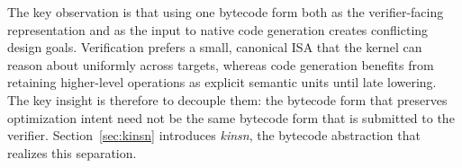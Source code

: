 %

The key observation is that using one bytecode form both as the verifier-facing representation and as the input to native code generation creates conflicting design goals. Verification prefers a small, canonical ISA that the kernel can reason about uniformly across targets, whereas code generation benefits from retaining higher-level operations as explicit semantic units until late lowering. The key insight is therefore to decouple them: the bytecode form that preserves optimization intent need not be the same bytecode form that is submitted to the verifier. Section~\ref{sec:kinsn} introduces \emph{kinsn}, the bytecode abstraction that realizes this separation.